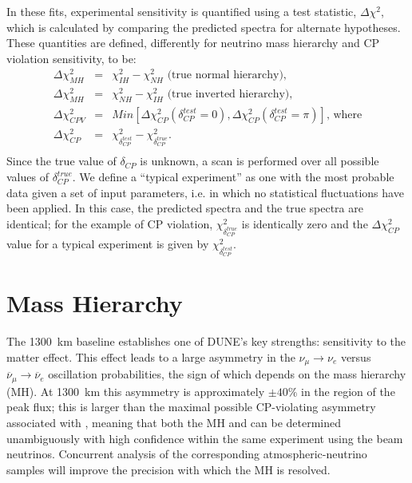 In these fits, experimental sensitivity is
quantified using a test statistic, $\Delta\chi^2$, which is calculated
by comparing the predicted spectra for alternate hypotheses.
These quantities are defined, differently for neutrino mass hierarchy
and CP violation sensitivity, to be:
\begin{eqnarray}
\Delta\chi^2_{MH} & = & \chi^2_{IH} - \chi^2_{NH}\textrm{ (true normal hierarchy),}\\ 
\Delta\chi^2_{MH} & = & \chi^2_{NH} - \chi^2_{IH}\textrm{ (true inverted hierarchy),}\\
\Delta\chi^2_{CPV} & = & Min[\Delta\chi^2_{CP}(\delta_{CP}^{test}=0),\Delta\chi^2_{CP}(\delta_{CP}^{test}=\pi)]\textrm{, where} \\
\Delta\chi^2_{CP} & = & \chi^2_{\delta_{CP}^{test}} - \chi^2_{\delta_{CP}^{true}}. \\ \nonumber
\end{eqnarray}
Since the true value of $\delta_{CP}$ is unknown, a scan is  performed over
all possible values of $\delta_{CP}^{true}$. 
We define a ``typical experiment'' as one with the most probable data given a set of input parameters, 
i.e. in which no statistical fluctuations have been applied.
In this case, the predicted spectra and the true spectra are identical;
for the example of CP violation, $\chi^2_{\delta_{CP}^{true}}$ 
is identically zero and the $\Delta\chi^2_{CP}$ value for a typical experiment is given by 
$\chi^2_{\delta_{CP}^{test}}$.

\section{Mass Hierarchy}
\label{sec:physics-lbnosc-mh}

The 1300~km baseline establishes one of DUNE's key strengths: sensitivity to the matter
effect. This effect leads to a large asymmetry in the
$\nu_\mu\to \nu_e$ versus $\overline{\nu}_\mu \to \overline{\nu}_e$
oscillation probabilities, the sign of which depends on the mass
hierarchy (MH).  At 1300~km this asymmetry is approximately
$\pm 40\%$ in the region of the peak flux; this is larger than the
maximal possible CP-violating asymmetry associated with \deltacp,
meaning that both the MH and \deltacp can be
determined unambiguously with high confidence within the same
experiment using the beam neutrinos.  Concurrent analysis of the corresponding atmospheric-neutrino samples will improve the precision with which the
MH is resolved. 

